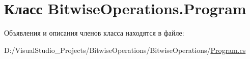 \hypertarget{class_bitwise_operations_1_1_program}{}\section{Класс Bitwise\+Operations.\+Program}
\label{class_bitwise_operations_1_1_program}


Объявления и описания членов класса находятся в файле\+:\begin{DoxyCompactItemize}
\item 
D\+:/\+Visual\+Studio\+\_\+\+Projects/\+Bitwise\+Operations/\+Bitwise\+Operations/\mbox{\hyperlink{_program_8cs}{Program.\+cs}}\end{DoxyCompactItemize}
